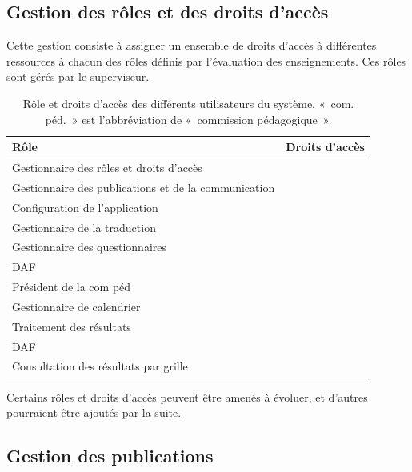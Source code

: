 \documentclass[a4paper,11pt]{report}
\begin{document}
\subsection{Gestion des rôles et des droits d'accès}
Cette gestion consiste à assigner un ensemble de droits d'accès à différentes ressources à chacun des rôles définis par l'évaluation des enseignements.
Ces rôles sont gérés par le superviseur.

\begin{table}[ht]
\begin{tabularx}{\textwidth}{|l|X|} \hline
Rôle & Droits d'accès \\ \hline
Gestionnaire des rôles et droits d'accès & \\ \hline
Gestionnaire des publications et de la communication & \\ \hline
Configuration de l'application & \\ \hline
Gestionnaire de la traduction & \\ \hline
Gestionnaire des questionnaires & \\ \hline
DAF & \\ \hline
Président de la com péd & \\ \hline
Gestionnaire de calendrier & \\ \hline
Traitement des résultats & \\ \hline
DAF & \\ \hline
Consultation des résultats par grille & \\ \hline

\end{tabularx}
\caption{Rôle et droits d'accès des différents utilisateurs du système. «~com. péd.~» est l'abbréviation de «~commission pédagogique~».}
\label{tab:role-droit}
\end{table}

Certains rôles et droits d'accès peuvent être amenés à évoluer, et d'autres pourraient être ajoutés par la suite.






\subsection{Gestion des publications}
\end{document}
